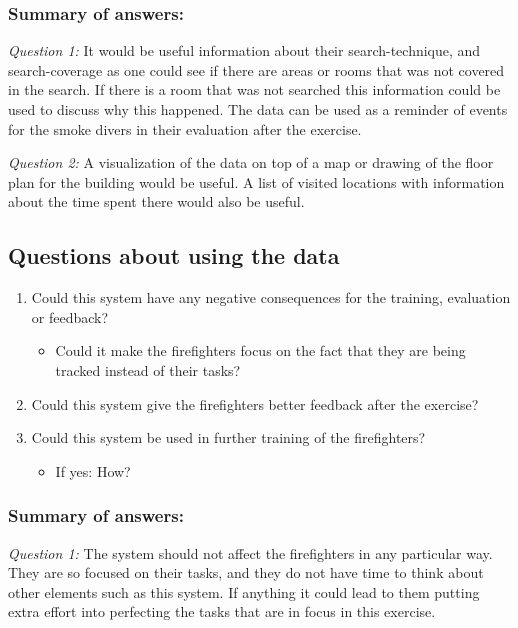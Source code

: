 \documentclass[../Main/thesis.tex]{subfiles}
\begin{document}
\subsubsection*{Summary of answers:}
\textit{Question 1:}
It would be useful information about their search-technique, and search-coverage as one could see if there are areas or rooms that was not covered in the search.
If there is a room that was not searched this information could be used to discuss why this happened.
The data can be used as a reminder of events for the smoke divers in their evaluation after the exercise.

\textit{Question 2:}
A visualization of the data on top of a map or drawing of the floor plan for the building would be useful.
A list of visited locations with information about the time spent there would also be useful.

\subsection{Questions about using the data}
\begin{enumerate}
	\item Could this system have any negative consequences for the training, evaluation or feedback?
	\begin{itemize}
		\item Could it make the firefighters focus on the fact that they are being tracked instead of their tasks?
	\end{itemize}
	\item Could this system give the firefighters better feedback after the exercise?
	\item Could this system be used in further training of the firefighters?
	\begin{itemize}
		\item If yes: How?
	\end{itemize}
\end{enumerate}

\subsubsection*{Summary of answers:}
\textit{Question 1:}
The system should not affect the firefighters in any particular way.
They are so focused on their tasks, and they do not have time to think about other elements such as this system.
If anything it could lead to them putting extra effort into perfecting the tasks that are in focus in this exercise.
\end{document}
